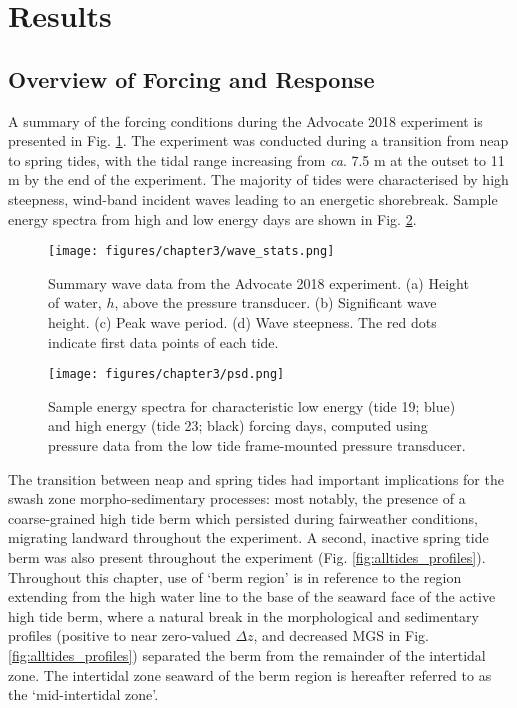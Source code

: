 \documentclass[preprint,12pt,authoryear]{elsarticle}
\begin{document}
\section{Results}\label{Results}

\subsection{Overview of Forcing and Response}\label{Results:Forcing}

A summary of the forcing conditions during the Advocate 2018 experiment is presented in Fig. \ref{fig:wavestats}. The experiment was conducted during a transition from neap to spring tides, with the tidal range increasing from \textit{ca}. 7.5 m at the outset to 11 m by the end of the experiment. The majority of tides were characterised by high steepness, wind-band incident waves leading to an energetic shorebreak. Sample energy spectra from high and low energy days are shown in Fig. \ref{fig:psd}.

\begin{figure}[tbp] %
	\texttt{[image: figures/chapter3/wave\_stats.png]}
	\caption[Wave data: Advocate 2018 experiment]{Summary wave data from the Advocate 2018 experiment. (a) Height of water, $h$, above the pressure transducer. (b) Significant wave height. (c) Peak wave period. (d) Wave steepness. The red dots indicate first data points of each tide.} %
	\label{fig:wavestats}
\end{figure}

\begin{figure}[tbp] %
	\begin{center}
		\texttt{[image: figures/chapter3/psd.png]}
		\caption[Energy spectra for high and low energy wave forcing]{Sample energy spectra for characteristic low energy (tide 19; blue) and high energy (tide 23; black) forcing days, computed using pressure data from the low tide frame-mounted pressure transducer.}
		\label{fig:psd}
	\end{center}
\end{figure}

The transition between neap and spring tides had important implications for the swash zone morpho-sedimentary processes: most notably, the presence of a coarse-grained high tide berm which persisted during fairweather conditions, migrating landward throughout the experiment. A second, inactive spring tide berm was also present throughout the experiment (Fig. \ref{fig:alltides_profiles}). Throughout this chapter, use of `berm region' is in reference to the region extending from the high water line to the base of the seaward face of the active high tide berm, where a natural break in the morphological and sedimentary profiles (positive to near zero-valued $\Delta z$, and decreased MGS in Fig. \ref{fig:alltides_profiles}) separated the berm from the remainder of the intertidal zone. The intertidal zone seaward of the berm region is hereafter referred to as the `mid-intertidal zone'.
\end{document}
